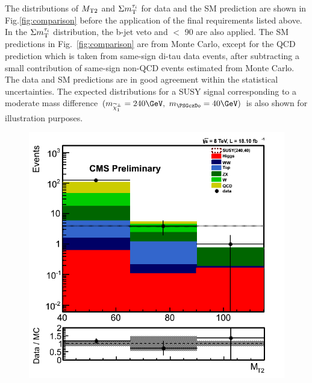 The distributions of ${M_{\rm T2}}$ and $\Sigma m_{\rm T}^{\tau_i}$ for data and the SM prediction
are shown in Fig.\ref{fig:comparison} before the application of the final
requirements listed above.
In the $\Sigma m_{\rm T}^{\tau_i}$ distribution, the b-jet veto and \mttwo $<$ 90 \GeV are also applied.
The SM predictions in Fig.~\ref{fig:comparison} 
are from Monte Carlo, except for the
QCD prediction which is taken from same-sign di-tau data events,
after subtracting a small contribution of same-sign non-QCD events estimated from Monte Carlo.
The data and SM predictions are in good agreement within the statistical uncertainties.
The expected distributions for a SUSY signal 
corresponding to a moderate mass difference $(m_{\chione}=240\GeV,~m_{\PSGczDo}=40\GeV)$
is also shown for illustration purposes.
\begin{figure}[!Hhtb]
\centering
\includegraphics[angle=0,scale=0.35]{TauTauFigs/mt2.png}

\end{figure}

